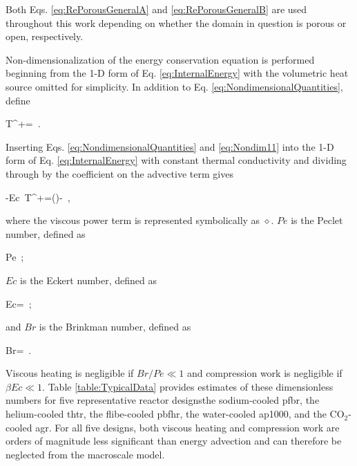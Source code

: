 \noindent Both Eqs. \eqref{eq:RePorousGeneralA} and \eqref{eq:RePorousGeneralB} are used throughout this work depending on whether the domain in question is porous or open, respectively. 

Non-dimensionalization of the energy conservation equation is performed beginning from the 1-D form of Eq. \eqref{eq:InternalEnergy} with the volumetric heat source omitted for simplicity. In addition to Eq. \eqref{eq:NondimensionalQuantities}, define

\beq
\label{eq:Nondim11}
T^+=\ .
\eeq

\noindent Inserting Eqs. \eqref{eq:NondimensionalQuantities} and \eqref{eq:Nondim11} into the 1-D form of Eq. \eqref{eq:InternalEnergy} with constant thermal conductivity and dividing through by the coefficient on the advective term gives

\beq
\label{eq:NondimensionalTemperatureEqn}
-\beta Ec\ T^+=(\diamond)-\ ,
\eeq

\noindent where the viscous power term is represented symbolically as \(\diamond\). \(Pe\) is the Peclet number, defined as

\beq
\label{eq:PecletDef}
Pe\equiv{}\ ;
\eeq


\noindent\(Ec\) is the Eckert number, defined as

\beq
\label{eq:EcNumber}
Ec=\ ;
\eeq

\noindent and \(Br\) is the Brinkman number, defined as

\beq
\label{eq:BrNumber}
Br=\ .
\eeq

\noindent Viscous heating is negligible if \(Br/Pe\ll1\) and compression work is negligible if \(\beta Ec\ll1\). Table \ref{table:TypicalData} provides estimates of these dimensionless numbers for five representative reactor designs\mdash the sodium-cooled \gls{pfbr}, the helium-cooled \gls{thtr}, the \gls{flibe}-cooled \gls{pbfhr}, the water-cooled \gls{ap1000}, and the CO$_2$-cooled \gls{agr}. For all five designs, both viscous heating and compression work are orders of magnitude less significant than energy advection and can therefore be neglected from the macroscale model.

